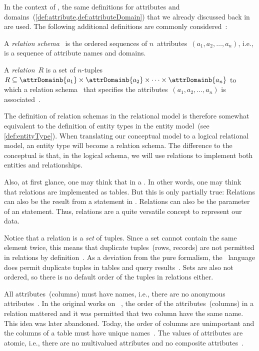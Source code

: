 %
In the context of , the same definitions for attributes and domains~(\cref{def:attribute,def:attributeDomain}) that we already discussed back in  are used.
The following additional definitions are commonly considered~\cite{C1970ARMODFLSDB}:%
%
\begin{definition}%
\sloppy%
\label{def:relationSchema}%
A \emph{relation schema}~ is the ordered sequences of $n$~attributes~$(a_1, a_2, \dots, a_n)$, i.e., is a sequence of attribute names and domains.%
\end{definition}%
\fussy%
%
\begin{definition}[Relation]%
\label{def:rdb:relation}%
A \emph{relation}~$R$ is a set of $n$\nobreakdashes-tuples $R\subseteq\attrDomainb{a_1}\times\attrDomainb{a_2}\times\dots\times\attrDomainb{a_n}$ to which a relation schema~ that specifies the attributes~$(a_1, a_2, \dots, a_n)$ is associated~\cite{SS2005EIDDDFDB:SDWSD2}.%
\end{definition}%
%
The definition of relation schemas in the relational model is therefore somewhat equivalent to the definition of entity types in the entity model~(see \cref{def:entityType}).
When translating our conceptual model to a logical relational model, an entity type will become a relation schema.
The difference to the conceptual is that, in the logical schema, we will use relations to implement both entities and relationships.

Also, at first glance, one may think that  in a \db.
In other words, one may think that relations are implemented as tables.
But this is only partially true:
Relations can also be the result from a  statement in \sql.
Relations can also be the parameter of an  statement.
Thus, relations are a quite versatile concept to represent our data.

Notice that a relation is a \emph{set} of tuples.
Since a set cannot contain the same element twice, this means that duplicate tuples~(rows, records) are not permitted in relations by definition~\cite{C20245YOQ}.
As a deviation from the pure formalism, the \sql\ language does permit duplicate tuples in tables and query results~\cite{C20245YOQ}.
Sets are also not ordered, so there is no default order of the tuples in relations either.

All attributes~(columns) must have names, i.e., there are no anonymous attributes~\cite{S2024D:LDMRMRA}.
In the original works on ~\cite{C1970ARMODFLSDB}, the order of the attributes~(columns) in a relation mattered and it was permitted that two column have the same name.
This idea was later abandoned.
Today, the order of columns are unimportant and the columns of a table must have unique names~\cite{S2024D:LDMRMRA}.
The values of attributes are atomic, i.e., there are no multivalued attributes and no composite attributes~\cite{S2024D:LDMRMRA,SS2005EIDDDFDB:SDLDUTRDM}.

